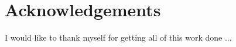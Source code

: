 \chapter{Acknowledgements}

\noindent

\normalsize

I would like to thank myself for getting all of this work done ...

